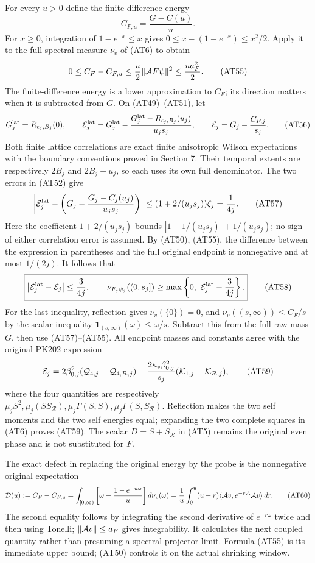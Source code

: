 \documentclass[11pt]{article}
\begin{document}
For every \(u>0\) define the finite-difference energy
\[
 C_{F,u}=\frac{G-C(u)}{u}.
 \tag{AT54}
\]
For \(x\ge0\), integration of \(1-e^{-x}\le x\) gives
\(0\le x-(1-e^{-x})\le x^2/2\).
Apply it to the full spectral measure \(\nu_v\) of (AT6) to obtain
\[
 0\le C_F-C_{F,u}
 \le\frac{u}{2}\|{\cal A}F\psi\|^2
 \le\frac{u a_F^2}{2}.
 \tag{AT55}
\]
The finite-difference energy is a lower approximation to \(C_F\); its direction matters when it is subtracted from \(G\).
On (AT49)–(AT51), let
\[
 G_j^{\rm lat}=R_{\epsilon_j,B_j}(0),\qquad
 {\cal E}^{\rm lat}_j
 =G_j^{\rm lat}
       -\frac{G_j^{\rm lat}-R_{\epsilon_j,B_j}(u_j)}
                    {u_js_j},\qquad
 {\cal E}_j=G_j-\frac{C_{F,j}}{s_j}.
 \tag{AT56}
\]
Both finite lattice correlations are exact finite anisotropic Wilson expectations with the boundary conventions proved in Section 7. Their temporal extents are respectively \(2B_j\) and \(2B_j+u_j\), so each uses its own full denominator.
The two errors in (AT52) give
\[
 \left|{\cal E}^{\rm lat}_j
       -\left(G_j-\frac{G_j-C_j(u_j)}{u_js_j}\right)\right|
 \le(1+2/(u_js_j))\zeta_j=\frac1{4j}.
 \tag{AT57}
\]
Here the coefficient \(1+2/(u_js_j)\) bounds
\(|1-1/(u_js_j)|+1/(u_js_j)\); no sign of either correlation error is assumed.
By (AT50), (AT55), the difference between the expression in parentheses and the full original endpoint is nonnegative and at most \(1/(2j)\). It follows that
\[
 \boxed{\left|{\cal E}^{\rm lat}_j-{\cal E}_j\right|
                    \le\frac{3}{4j},\qquad
 \nu_{F_j\psi_j}((0,s_j])
       \ge\max\left\{0,\ {\cal E}^{\rm lat}_j-\frac{3}{4j}\right\}.}
 \tag{AT58}
\]
For the last inequality, reflection gives \(\nu_v(\{0\})=0\), and
\(\nu_v((s,\infty))\le C_F/s\) by the scalar inequality
\(\mathbf1_{(s,\infty)}(\omega)\le\omega/s\).
Subtract this from the full raw mass \(G\), then use (AT57)–(AT55).
All endpoint masses and constants agree with the original PK202 expression
\[
 {\cal E}_j=
 2\beta_{0,j}^2(\mathcal Q_{4,j}-\mathcal Q_{4,\mathcal R,j})
 -\frac{2\kappa_*\beta_{0,j}^2}{s_j}
                (\mathcal K_{1,j}-\mathcal K_{\mathcal R,j}),
 \tag{AT59}
\]
where the four quantities are respectively
\(\mu_jS^2,\mu_j(SS_{\mathcal R}),
 \mu_j\Gamma(S,S),\mu_j\Gamma(S,S_{\mathcal R})\).
Reflection makes the two self moments and the two self energies equal; expanding the two complete squares in (AT6) proves (AT59). The scalar \(D=S+S_{\mathcal R}\) in (AT5) remains the original even phase and is not substituted for \(F\).

The exact defect in replacing the original energy by the probe is the nonnegative original expectation
\[
 {\cal D}(u):=C_F-C_{F,u}
  =\int_{[0,\infty)}
       \left[\omega-\frac{1-e^{-u\omega}}u\right]d\nu_v(\omega)
  =\frac1u\int_0^u(u-r)
       \langle{\cal A}v,e^{-r{\cal A}}{\cal A}v\rangle\,dr .
 \tag{AT60}
\]
The second equality follows by integrating the second derivative of
\(e^{-r\omega}\) twice and then using Tonelli; \(\|{\cal A}v\|\le a_F\) gives integrability. It calculates the next coupled quantity rather than presuming a spectral-projector limit. Formula (AT55) is its immediate upper bound; (AT50) controls it on the actual shrinking window.
\end{document}
